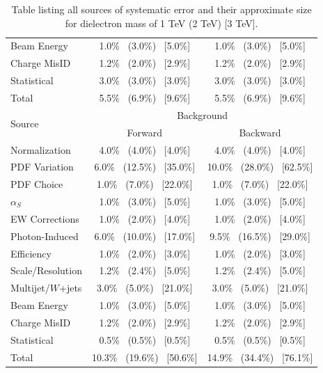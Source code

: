 \begin {table}[h]
\begin{center}
\begin{tabular}{ | l | c c | }
            Beam Energy         & 1.0\% ~(3.0\%) ~[5.0\%]           & 1.0\% ~(3.0\%) ~[5.0\%]         \\
            Charge MisID        & 1.2\% ~(2.0\%) ~[2.9\%]           &  1.2\% ~(2.0\%) ~[2.9\%]        \\
            Statistical         & 3.0\% ~(3.0\%) ~[3.0\%]           & 3.0\% ~(3.0\%) ~[3.0\%]         \\
            \hline  
            Total               & 5.5\% ~(6.9\%) ~[9.6\%]             & 5.5\% ~(6.9\%) ~[9.6\%]        \\
            \hline
            \hline
            \multirow{2}{*}{Source} & \multicolumn{2}{c|}{Background}                                    \\
                                & Forward                           & Backward                      \\
            \hline
            Normalization       & 4.0\% ~(4.0\%) ~[4.0\%]           & 4.0\% ~(4.0\%) ~[4.0\%] \\
            PDF Variation       & 6.0\% ~(12.5\%) ~[35.0\%]         & 10.0\% ~(28.0\%) ~[62.5\%] \\
            PDF Choice          & 1.0\% ~(7.0\%) ~[22.0\%]          & 1.0\% ~(7.0\%) ~[22.0\%] \\
            $\alpha_S$          & 1.0\% ~(3.0\%) ~[5.0\%]           & 1.0\% ~(3.0\%) ~[5.0\%] \\
            EW Corrections      & 1.0\% ~(2.0\%) ~[4.0\%]           & 1.0\% ~(2.0\%) ~[4.0\%] \\
            Photon-Induced      & 6.0\% ~(10.0\%) ~[17.0\%]         & 9.5\% ~(16.5\%) ~[29.0\%]    \\
            Efficiency          & 1.0\% ~(2.0\%) ~[3.0\%]           & 1.0\% ~(2.0\%) ~[3.0\%] \\
            Scale/Resolution    & 1.2\% ~(2.4\%) ~[5.0\%]           & 1.2\% ~(2.4\%) ~[5.0\%] \\
            Multijet/$W$+jets  & 3.0\% ~(5.0\%) ~[21.0\%]          & 3.0\% ~(5.0\%) ~[21.0\%] \\
            Beam Energy         & 1.0\% ~(3.0\%) ~[5.0\%]           & 1.0\% ~(3.0\%) ~[5.0\%] \\
            Charge MisID        & 1.2\% ~(2.0\%) ~[2.9\%]           & 1.2\% ~(2.0\%) ~[2.9\%] \\
            Statistical         & 0.5\% ~(0.5\%) ~[0.5\%]           & 0.5\% ~(0.5\%) ~[0.5\%] \\
            \hline   
            Total               & 10.3\% ~(19.6\%) ~[50.6\%]        & 14.9\% ~(34.4\%) ~[76.1\%] \\ 
            \hline
        \end{tabular}
        \caption{Table listing all sources of systematic error and their approximate size for dielectron mass of 1 TeV (2 TeV) [3 TeV].}
        \label{tab:sys}
        \end{center}
    \end {table}



